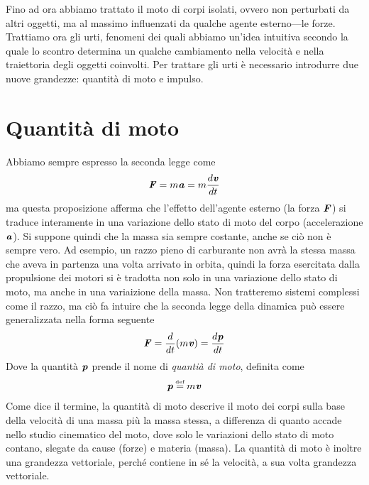 \marginpar{\minitoc}

Fino ad ora abbiamo trattato il moto di corpi isolati, ovvero non
perturbati da altri oggetti, ma al massimo influenzati da qualche agente
esterno—le forze. Trattiamo ora gli urti, fenomeni dei quali abbiamo
un'idea intuitiva secondo la quale lo scontro determina un qualche
cambiamento nella velocità e nella traiettoria degli oggetti coinvolti.
Per trattare gli urti è necessario introdurre due nuove grandezze:
quantità di moto e impulso.


\section{Quantità di moto}
Abbiamo sempre espresso la seconda legge come
\[ \textbf{\textit{F}} = m\textbf{\textit{a}} = m\frac{d\textbf{\textit{v}}}{dt} \]
ma questa proposizione afferma che l'effetto dell'agente esterno (la forza
$\textbf{\textit{F}}$) si traduce interamente in una variazione dello stato di
moto del corpo (accelerazione $\textbf{\textit{a}}$). Si suppone quindi che la
massa sia sempre costante, anche se ciò non è sempre vero. Ad esempio,
un razzo pieno di carburante non avrà la stessa massa che aveva in partenza
una volta arrivato in orbita, quindi la forza esercitata dalla propulsione
dei motori si è tradotta non solo in una variazione dello stato di moto,
ma anche in una variaizione della massa. Non tratteremo sistemi complessi
come il razzo, ma ciò fa intuire che la seconda legge della dinamica può
essere generalizzata nella forma seguente
\begin{align}
    \textbf{\textit{F}} = \frac{d}{dt}(m\textbf{\textit{v}}) = \frac{d\textbf{\textit{p}}}{dt}\label{qtamotosecondalegge}
\end{align}
Dove la quantità $\textbf{\textit{p}}$ prende il nome di \textit{quantià di moto},
definita come
\begin{align}
    \vecsymb{p} \eqdef m\vecsymb{v}
\end{align}
Come dice il termine, la quantità di moto descrive il moto dei corpi
sulla base della velocità di una massa più la massa stessa, a differenza
di quanto accade nello studio cinematico del moto, dove solo le variazioni
dello stato di moto contano, slegate da cause (forze) e materia (massa).
La quantità di moto è inoltre una grandezza vettoriale, perché contiene
in sé la velocità, a sua volta grandezza vettoriale.



